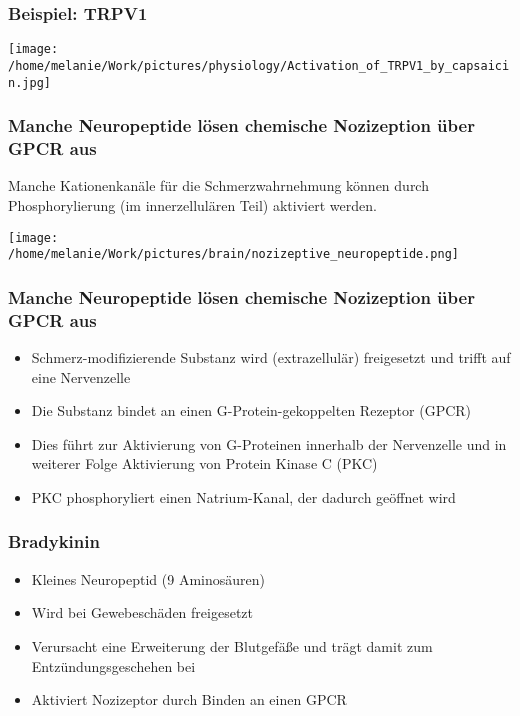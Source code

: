 \documentclass{beamer}
\begin{document}
\begin{frame}
\frametitle{Beispiel: TRPV1}

\begin{center}
\texttt{[image: /home/melanie/Work/pictures/physiology/Activation\_of\_TRPV1\_by\_capsaicin.jpg]}
\end{center}



\end{frame}



\begin{frame}
\frametitle{Manche Neuropeptide lösen chemische Nozizeption über GPCR aus}


Manche Kationenkanäle für die Schmerzwahrnehmung können durch Phosphorylierung (im innerzellulären Teil) aktiviert werden. 


\begin{center}
\texttt{[image: /home/melanie/Work/pictures/brain/nozizeptive\_neuropeptide.png]}
\end{center}



\end{frame}



\begin{frame}
\frametitle{Manche Neuropeptide lösen chemische Nozizeption über GPCR aus}


\begin{itemize}
\item 
Schmerz-modifizierende Substanz wird (extrazellulär) freigesetzt und trifft auf eine Nervenzelle
\item
Die Substanz bindet an einen G-Protein-gekoppelten Rezeptor (GPCR)
\item
Dies führt zur Aktivierung von G-Proteinen innerhalb der Nervenzelle und in weiterer Folge Aktivierung von Protein Kinase C (PKC)
\item
PKC phosphoryliert einen Natrium-Kanal, der dadurch geöffnet wird
\end{itemize}


\end{frame}


\begin{frame}


\frametitle{Bradykinin}

\begin{itemize}
\item
Kleines Neuropeptid (9 Aminosäuren)
\item
Wird bei Gewebeschäden freigesetzt 
\item
Verursacht eine Erweiterung der Blutgefäße und trägt damit zum Entzündungsgeschehen bei
\item
Aktiviert Nozizeptor durch Binden an einen GPCR
\end{itemize}


\end{frame}
\end{document}
